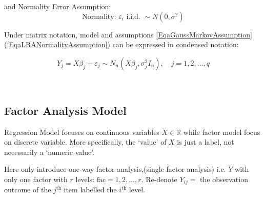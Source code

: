 and Normality Error Assumption: 
\begin{equation}\label{EqaLRANormalityAssumption}
    \text{Normality: }\varepsilon _i \text{ i.i.d. }\sim N(0,\sigma ^2) 
\end{equation}

    Under matrix notation, model and assumptions \autoref{EqaGaussMarkovAssumption}(\autoref{EqaLRANormalityAssumption}) can be expressed in condensed notation:

    \begin{equation}
        Y_j=X\beta_j +\varepsilon_j  \sim N_n(X\beta_j ,\sigma_j^2I_n),\quad j=1,2,\ldots,q
    \end{equation}

\\


\subsection{Factor Analysis Model}\label{SubSubSectionFactorAnalysisModelIntroduction}
    Regression Model focuses on continuous variables $ X\in\mathbb{R} $ while factor model focus on discrete variable. More specifically, the `value' of $ X $ is just a label, not necessarily a `numeric value'.

    Here only introduce one-way factor analysis,(single factor analysis) i.e. $ Y $ with only one factor with $ r $ levels: $ \mathrm{fac} =1,2,\ldots,r $. Re-denote $ Y_{ij}= $ the observation outcome of the $ j^\mathrm{th}  $ item labelled the $ i^\mathrm{th}  $ level.

